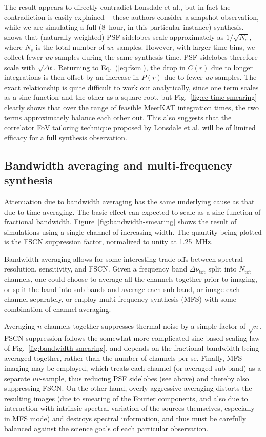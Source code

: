 \documentclass{aa}
\begin{document}
The result appears to directly contradict Lonsdale et al., but in fact the contradiction is easily explained -- these authors consider a snapshot observation, while we are simulating a full (8~hour, in this particular instance) synthesis. \citet{SKA49} shows that (naturally weighted) PSF sidelobes scale approximately as $1/\sqrt{N_s}$, where $N_s$ is the total number of $uv$-samples. However, with larger time bins, we collect fewer $uv$-samples during the same synthesis time. PSF sidelobes therefore scale with $\sqrt{\Delta t}$. Returning to Eq.~(\ref{eq:fscn}), the drop in $C(r)$ due to longer integrations is then offset by an increase in $P(r)$ due to fewer $uv$-samples. The exact relationship is quite difficult to work out analytically, since one term scales as a sinc function and the other as a square root, but  Fig.~\ref{fig:cc-time-smearing} clearly shows that over the range of feasible MeerKAT integration times, the two terms approximately balance each other out. This also suggests that the correlator FoV tailoring technique proposed by Lonsdale et al. will be of limited efficacy for a full synthesis observation.

\subsection{Bandwidth averaging and multi-frequency synthesis}
\label{sec:freq-avg}

Attenuation due to bandwidth averaging has the same underlying cause as that due to time averaging. The basic effect can expected to scale as a sinc function of fractional bandwidth. Figure~\ref{fig:bandwidth-smearing} shows the result of simulations using a single channel of increasing width. The quantity being plotted is the FSCN suppression factor, normalized to unity at 1.25~MHz.

Bandwidth averaging allows for some interesting trade-offs between spectral resolution, sensitivity, and FSCN. Given a frequency band $\Delta\nu_\mathrm{tot}$ split into $N_\mathrm{tot}$ channels, one could choose to average all the channels together prior to imaging, or split the band into sub-bands and average each sub-band, or image each channel separately, or employ multi-frequency synthesis (MFS) with some combination of channel averaging. 

Averaging $n$ channels together suppresses thermal noise by a simple factor of $\sqrt{n}$. FSCN suppression follows the somewhat more complicated sinc-based scaling law of Fig.~\ref{fig:bandwidth-smearing}, and depends on the fractional bandwidth being averaged together, rather than the number of channels per se. Finally, MFS imaging may be employed, which treats each channel (or averaged sub-band) as a separate $uv$-sample, thus reducing PSF sidelobes (see above) and thereby also suppressing FSCN. On the other hand, overly aggressive averaging distorts the resulting images (due to smearing of the Fourier components, and also due to interaction with intrinsic spectral variation of the sources themselves, especially in MFS mode) and destroys spectral information, and thus must be carefully balanced against the science goals of each particular observation.
\end{document}
